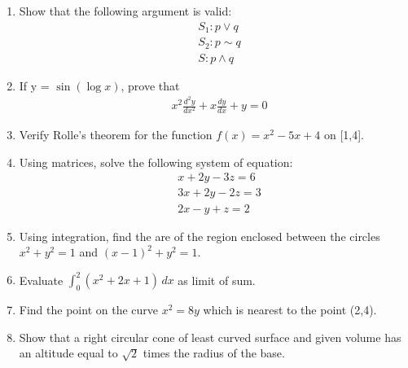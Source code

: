 \documentclass[journal,12pt,twocolumn]{IEEEtran}
\renewcommand\thesection{\arabic{section}}
\begin{document}
\begin{enumerate}[label=\thesection.\arabic*.,ref=\thesection.\theenumi]
 \item Show that the following argument is valid:
 \begin{align}
    & S_1 : p \vee q \nonumber \\
    & S_2 : p \sim q \nonumber\\
    & S : p \wedge q \nonumber
 \end{align}

 \item If y = $\sin(\log x)$, prove that
 \begin{align}
    & x^2\displaystyle\frac{d^2y}{dx^2} + x\displaystyle\frac{dy}{dx} + y = 0 \nonumber
 \end{align}

 \item Verify Rolle's theorem for the function $ f(x) = x^2-5x+4 $ on [1,4].

 \item Using matrices, solve the following system of equation:
 \begin{align}
    & x+2y-3z=6 \nonumber   \\
     & 3x+2y-2z=3 \nonumber   \\
     & 2x-y+z=2 \nonumber 
 \end{align}

 \item Using integration, find the are of the region enclosed between the circles $x^2+y^2=1$ and $(x-1)^2+y^2=1$. 

 \item Evaluate $ \int_{0}^{2} (x^2+2x+1)\, dx $ as limit of sum. 

 \item Find the point on the curve $x^2=8y $ which is nearest to the point (2,4).

 \item Show that a right circular cone of least curved surface and given volume has an altitude equal to $ \sqrt{2} $ times the radius of the base.
\end{enumerate}
\end{document}
